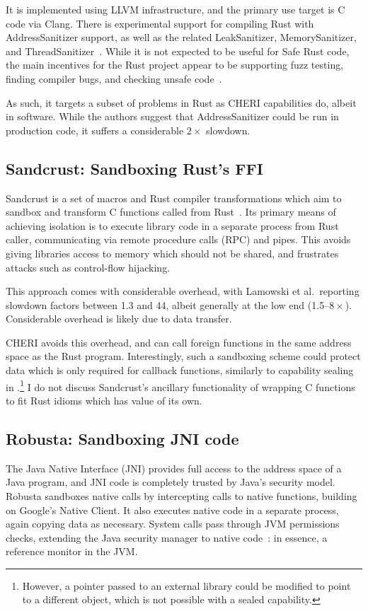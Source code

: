 \documentclass[dissertation.tex]{subfiles}
\begin{document}
It is implemented using LLVM infrastructure, and the primary use target
is C code via Clang.
There is experimental support for compiling Rust with AddressSanitizer
support, as well as the related LeakSanitizer, MemorySanitizer, and
ThreadSanitizer~\cite{rust-san}.
While it is not expected to be useful for Safe Rust code, the main
incentives for the Rust project appear to be supporting fuzz testing,
finding compiler bugs, and checking unsafe code~\cite{rust-asan-track}.

As such, it targets a subset of problems in Rust as CHERI capabilities
do, albeit in software.
While the authors suggest that AddressSanitizer could be run in
production code, it suffers a considerable \(2\times\) slowdown.


\subsection{Sandcrust: Sandboxing Rust's FFI}
\label{sec:rel-sandcrust}

Sandcrust is a set of macros and Rust compiler transformations which aim
to sandbox and transform C functions called from
Rust~\cite{lamowski-sandcrust}.
Its primary means of achieving isolation is to execute library code in a
separate process from Rust caller, communicating via remote procedure
calls (RPC) and pipes.
This avoids giving libraries access to memory which should not be
shared, and frustrates attacks such as control-flow hijacking.

This approach comes with considerable overhead, with Lamowski et al.\
reporting slowdown factors between 1.3 and 44, albeit generally at the
low end (1.5--\(8\times\)).
Considerable overhead is likely due to data transfer.

CHERI avoids this overhead, and can call foreign functions in the same
address space as the Rust program.
Interestingly, such a sandboxing scheme could protect data which is only
required for callback functions, similarly to capability sealing in
\Cref{sec:eval-rust-xprocess}.\footnote{
    However, a pointer passed to an external library could be modified
    to point to a different object, which is not possible with a sealed
    capability.
}
I do not discuss Sandcrust's ancillary functionality of wrapping C
functions to fit Rust idioms which has value of its own.


\subsection{Robusta: Sandboxing JNI code}
The Java Native Interface (JNI) provides full access to the address
space of a Java program, and JNI code is completely trusted by Java's
security model.
Robusta sandboxes native calls by intercepting calls to native
functions, building on Google's Native Client.
It also executes native code in a separate process, again copying data
as necessary.
System calls pass through JVM permissions checks, extending the Java
security manager to native code~\cite{siefers-robusta}: in essence, a
reference monitor in the JVM.
\end{document}
